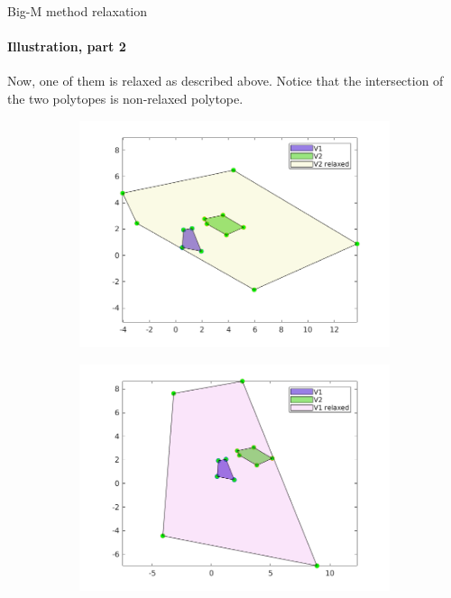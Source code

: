 \documentclass{beamer}
\begin{document}
\begin{frame}{Big-M method relaxation}
\framesubtitle{Illustration, part 2}
\begin{flushleft}

Now, one of them is relaxed as described above. Notice that the intersection of the two polytopes is non-relaxed polytope. 

\begin{figure}
\centering
\begin{subfigure}{.5\textwidth}
  \centering
  \includegraphics[width=1.1\linewidth]{fig2.png}
\end{subfigure}%
\begin{subfigure}{.5\textwidth}
  \centering
  \includegraphics[width=1.1\linewidth]{fig3.png}
\end{subfigure}
\end{figure}

\end{flushleft}
\end{frame}
\end{document}
